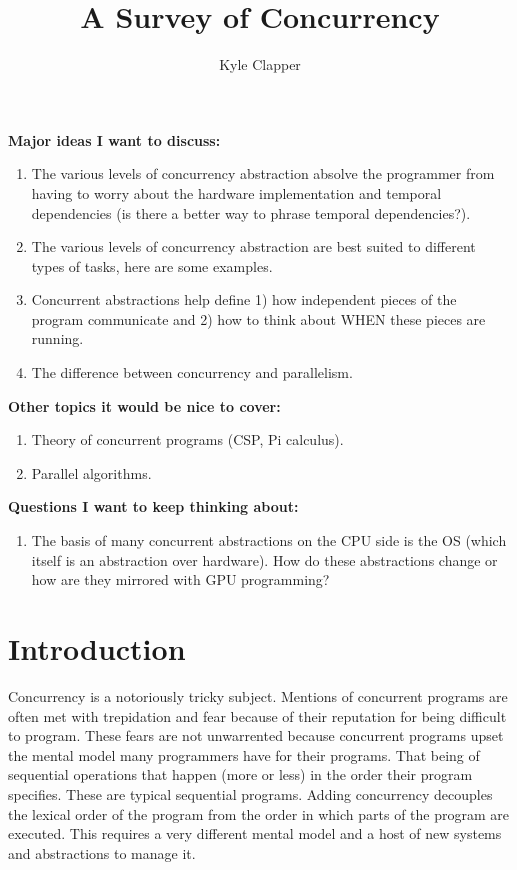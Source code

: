 \documentclass{article}
\title{A Survey of Concurrency}
\author{Kyle Clapper}
\begin{document}
\maketitle


\textbf{Major ideas I want to discuss:}
\begin{enumerate}
  \item The various levels of concurrency abstraction absolve the programmer
        from having to worry about the hardware implementation and temporal
        dependencies (is there a better way to phrase temporal dependencies?).

  \item The various levels of concurrency abstraction are best suited to
        different types of tasks, here are some examples.

  \item Concurrent abstractions help define 1) how independent pieces of the
        program communicate and 2) how to think about WHEN these pieces are
        running.

  \item The difference between concurrency and parallelism.

\end{enumerate}

\textbf{Other topics it would be nice to cover:}
\begin{enumerate}
  \item Theory of concurrent programs (CSP, Pi calculus).

  \item Parallel algorithms.
\end{enumerate}

\textbf{Questions I want to keep thinking about:}
\begin{enumerate}
  \item The basis of many concurrent abstractions on the CPU side is the OS
        (which itself is an abstraction over hardware). How do these
        abstractions change or how are they mirrored with GPU programming?
\end{enumerate}

\section{Introduction}
Concurrency is a notoriously tricky subject. Mentions of concurrent programs are
often met with trepidation and fear because of their reputation for being
difficult to program. These fears are not unwarrented because concurrent
programs upset the mental model many programmers have for their programs. That
being of sequential operations that happen (more or less) in the order their
program specifies. These are typical sequential programs. Adding concurrency
decouples the lexical order of the program from the order in which parts of the
program are executed. This requires a very different mental model and a host of
new systems and abstractions to manage it.
\end{document}
